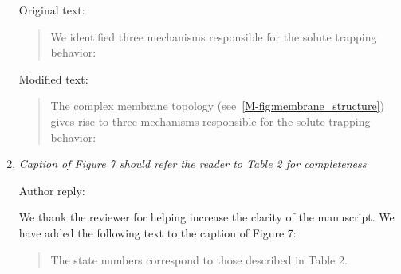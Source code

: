 \documentclass{article}
\begin{document}
\begin{enumerate}[label={Comment \theenumi :}, leftmargin=3.9\parindent]
    Original text:
    \begin{quote}  
    We identified three mechanisms responsible for the solute trapping behavior: 
    \end{quote}
    
    Modified text:
    \begin{quote}
    The complex membrane topology (see~\ref{M-fig:membrane_structure}) gives rise to
    three mechanisms responsible for the solute trapping behavior: 
    \end{quote}

    \item \textit{Caption of Figure 7 should refer the reader to Table 2 for completeness}
    
    Author reply:
    
    We thank the reviewer for helping increase the clarity of the manuscript. We have added
    the following text to the caption of Figure 7:
    \begin{quote}
    The state numbers correspond to those described in Table 2.
	\end{quote}

\end{enumerate}



\end{document}
